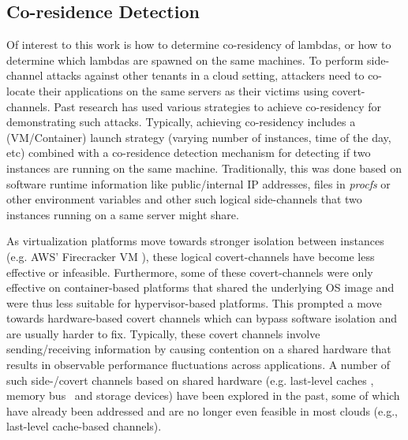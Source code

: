 \subsection{Co-residence Detection}
\label{sec:background:pastwork}

Of interest to this work is how to determine co-residency of lambdas, or how to
determine which lambdas are spawned on the same machines.  To perform
side-channel attacks against other tenants in a cloud setting, attackers need to
co-locate their applications on the same servers as their victims using
covert-channels. Past research has used various strategies to achieve
co-residency for demonstrating such attacks. Typically, achieving co-residency
includes a (VM/Container) launch strategy (varying number of instances, time of
the day, etc) combined with a co-residence detection mechanism for detecting if
two instances are running on the same machine. Traditionally, this was done
based on software runtime information like public/internal IP
addresses\cite{ristenpartccs2009}, files in \textit{procfs} or other environment
variables\cite{wangusenix2018} and other such logical
side-channels\cite{varad191016,vmplacement} that two instances running on a same
server might share. 

As virtualization platforms move towards stronger isolation between instances
(e.g. AWS' Firecracker VM \cite{firecracker}), these logical covert-channels
have become less effective or infeasible. Furthermore, some of these
covert-channels were only effective on container-based platforms that shared the
underlying OS image and were thus less suitable for hypervisor-based platforms.
This prompted a move towards hardware-based covert channels which can bypass
software isolation and are usually harder to fix. Typically, these covert
channels involve sending/receiving information by causing contention on a shared
hardware that results in observable performance fluctuations across
applications. A number of such side-/covert channels based on shared hardware
(e.g. last-level caches , memory
bus~\cite{wuusenix2012,zhang2016,varadarajan2015} and storage
devices) have been explored in the past, some of which have
already been addressed and are no longer even feasible in most clouds (e.g.,
last-level cache-based channels\cite{cache-sidechannels}). 

